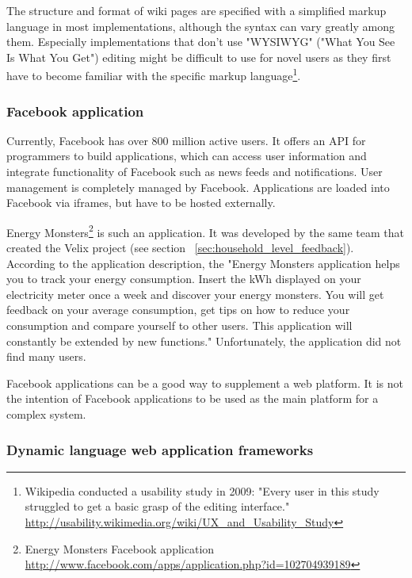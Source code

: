 The structure and format of wiki pages are specified with a simplified markup language in most implementations, although the syntax can vary greatly among them. Especially implementations that don't use "WYSIWYG" ("What You See Is What You Get") editing might be difficult to use for novel users as they first have to become familiar with the specific markup language\footnote{Wikipedia conducted a usability study in 2009: "Every user in this study struggled to get a basic grasp of the editing interface." \url{http://usability.wikimedia.org/wiki/UX_and_Usability_Study}}\cite{wikis_collaboration}.


\subsubsection{Facebook application}
Currently, Facebook has over 800 million active users. It offers an API for programmers to build applications, which can access user information and integrate functionality of Facebook such as news feeds and notifications. User management is completely managed by Facebook. Applications are loaded into Facebook via iframes, but have to be hosted externally.

Energy Monsters\footnote{Energy Monsters Facebook application \url{http://www.facebook.com/apps/application.php?id=102704939189}} is such an application. It was developed by the same team that created the Velix project (see section ~\ref{sec:household_level_feedback}). According to the application description, the "Energy Monsters application helps you to track your energy consumption. Insert the kWh displayed on your electricity meter once a week and discover your energy monsters. You will get feedback on your average consumption, get tips on how to reduce your consumption and compare yourself to other users. This application will constantly be extended by new functions." Unfortunately, the application did not find many users. 

Facebook applications can be a good way to supplement a web platform. It is not the intention of Facebook applications to be used as the main platform for a complex system.

\subsubsection{Dynamic language web application frameworks}

